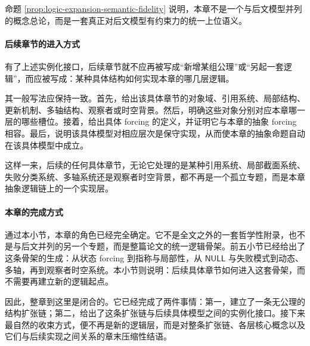 命题 \ref{prop:logic-expansion-semantic-fidelity} 说明，本章不是一个与后文模型并列的概念总论，而是一套真正对后文模型有约束力的统一上位语义。

\paragraph{后续章节的进入方式}
有了上述实例化接口，后续章节就不应再被写成“新增某组公理”或“另起一套逻辑”，而应被写成：某种具体结构如何实现本章的哪几层逻辑。

其一般写法应保持一致。首先，给出该具体章节的对象域、引用系统、局部结构、更新机制、多轴结构、观察者或时空背景。然后，明确这些对象分别对应本章哪一层的哪些槽位。接着，给出具体 forcing 的定义，并证明它与本章的抽象 forcing 相容。最后，说明该具体模型对相应层次是保守实现，从而使本章的抽象命题自动在该具体模型中成立。

这样一来，后续的任何具体章节，无论它处理的是某种引用系统、局部截面系统、失败分类系统、多轴系统还是观察者时空背景，都不再是一个孤立专题，而是本章抽象逻辑链上的一个实现层。



\paragraph{本章的完成方式}
通过本小节，本章的角色已经完全确定。它不是全文之外的一套哲学性附录，也不是与后文并列的另一个专题，而是整篇论文的统一逻辑骨架。前五小节已经给出了这条骨架的生成：从状态 forcing 到指称与局部性，从 \(\mathsf{NULL}\) 与失败模式到动态、多轴，再到观察者时空系统。本小节则说明：后续具体章节如何进入这套骨架，而不需要再建立新的逻辑起点。

因此，整章到这里是闭合的。它已经完成了两件事情：第一，建立了一条无公理的结构扩张链；第二，给出了这条扩张链与后续具体模型之间的实例化接口。接下来最自然的收束方式，便不再是新的逻辑层，而是对整条扩张链、各层核心概念以及它们与后续实现之间关系的章末压缩性结语。
